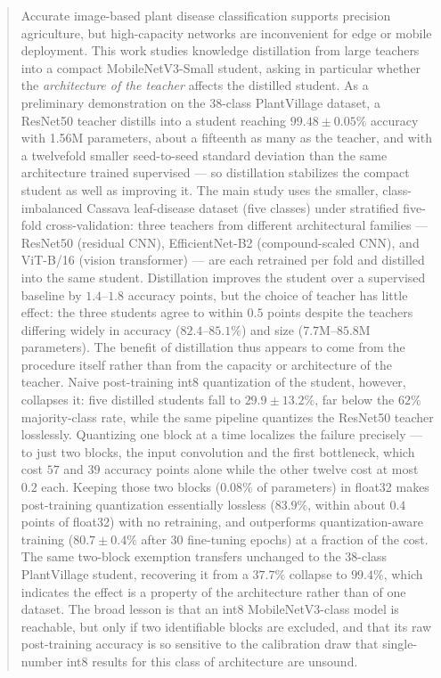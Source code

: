\documentclass[conference]{IEEEtran}
\begin{document}
\begin{abstract}
Accurate image-based plant disease classification supports precision
agriculture, but high-capacity networks are inconvenient for edge or mobile
deployment. This work studies knowledge distillation from large teachers into a
compact MobileNetV3-Small student, asking in particular whether the
\emph{architecture of the teacher} affects the distilled student. As a
preliminary demonstration on the 38-class PlantVillage dataset, a ResNet50
teacher distills into a student reaching $99.48\pm0.05\%$ accuracy with 1.56M
parameters, about a fifteenth as many as the teacher, and with a twelvefold smaller
seed-to-seed standard deviation than the same architecture trained supervised ---
so
distillation stabilizes the compact student as well as improving it. The main
study uses the smaller, class-imbalanced Cassava leaf-disease dataset (five
classes) under stratified five-fold cross-validation: three teachers from
different architectural families --- ResNet50 (residual CNN), EfficientNet-B2
(compound-scaled CNN), and ViT-B/16 (vision transformer) --- are each retrained
per fold and distilled into the same student. Distillation improves the student
over a supervised baseline by $1.4$--$1.8$ accuracy points, but the choice of
teacher has little effect: the three students agree to within $0.5$ points
despite the teachers differing widely in accuracy ($82.4$--$85.1\%$) and size
($7.7$M--$85.8$M parameters). The benefit of distillation thus appears to come
from the procedure itself rather than from the capacity or architecture of the
teacher. Naive post-training int8 quantization of the student, however,
collapses it: five distilled students fall to $29.9\pm13.2\%$, far below the
$62\%$ majority-class rate, while the same pipeline quantizes the ResNet50 teacher
losslessly. Quantizing one block at a time localizes the failure precisely --- to
just two blocks, the input convolution and the first bottleneck, which cost $57$
and $39$ accuracy points alone while the other twelve cost at most $0.2$ each.
Keeping those two blocks ($0.08\%$ of parameters) in float32 makes post-training
quantization essentially lossless ($83.9\%$, within about $0.4$ points of
float32) with no retraining, and outperforms quantization-aware training
($80.7\pm0.4\%$ after 30 fine-tuning epochs) at a fraction of the cost. The same
two-block exemption transfers unchanged to the 38-class PlantVillage student,
recovering it from a $37.7\%$ collapse to $99.4\%$, which indicates the effect is
a property of the architecture rather than of one dataset. The broad lesson is
that an int8 MobileNetV3-class model is reachable, but only if two identifiable
blocks are excluded, and that its raw post-training accuracy is so sensitive to
the calibration draw that single-number int8 results for this class of
architecture are unsound.
\end{abstract}
\end{document}
